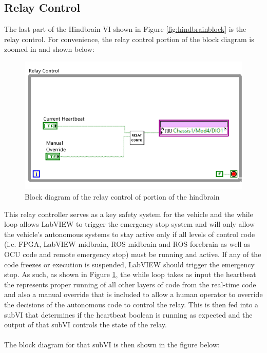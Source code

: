 \subsection{Relay Control}

The last part of the Hindbrain VI shown in Figure \ref{fig:hindbrainblock} is the relay control. For convenience, the relay control portion of the block diagram is zoomed in and shown below:

\begin{figure}[h!]
\centering
\includegraphics[scale=1.4]{Photos/relaycontrolportion.png}
\caption{Block diagram of the relay control of portion of the hindbrain}
\label{fig:relaycontrolportion}
\end{figure}

\noindent This relay controller serves as a key safety system for the vehicle and the while loop allows LabVIEW to trigger the emergency stop system and will only allow the vehicle's autonomous systems to stay active only if all levels of control code (i.e. FPGA, LabVIEW midbrain, ROS midbrain and ROS forebrain as well as OCU code and remote emergency stop) must be running and active. If any of the code freezes or execution is suspended, LabVIEW should trigger the emergency stop. As such, as shown in Figure \ref{fig:relaycontrolportion}, the while loop  takes as input the heartbeat the represents proper running of all other layers of code from the real-time code and also a manual override that is included to allow a human operator to override the decisions of the autonomous code to control the relay. This is then fed into a subVI that determines if the heartbeat boolean is running as expected and the output of that subVI controls the state of the relay. \\ \\
%
The block diagram for that subVI is then shown in the figure below:

